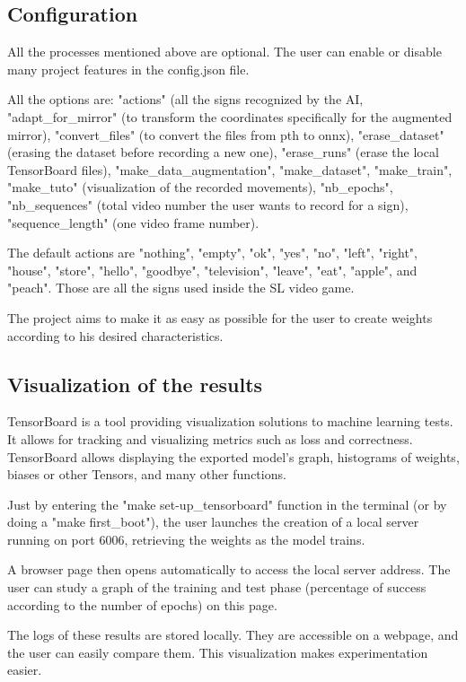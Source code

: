 \subsection{Configuration}

All the processes mentioned above are optional. The user can enable or disable many project features in the config.json file. 

All the options are: "actions" (all the signs recognized by the AI, "adapt\_for\_mirror" (to transform the coordinates specifically for the augmented mirror), "convert\_files" (to convert the files from pth to onnx), "erase\_dataset" (erasing the dataset before recording a new one), "erase\_runs" (erase the local TensorBoard files), "make\_data\_augmentation", "make\_dataset", "make\_train", "make\_tuto" (visualization of the recorded movements), "nb\_epochs", "nb\_sequences" (total video number the user wants to record for a sign), "sequence\_length" (one video frame number).

The default actions are "nothing", "empty", "ok", "yes", "no", "left", "right", "house", "store", "hello", "goodbye", "television", "leave", "eat", "apple", and "peach". Those are all the signs used inside the SL video game.

The project aims to make it as easy as possible for the user to create weights according to his desired characteristics.

\subsection{Visualization of the results}

TensorBoard is a tool providing visualization solutions to machine learning tests. It allows for tracking and visualizing metrics such as loss and correctness. TensorBoard allows displaying the exported model's graph, histograms of weights, biases or other Tensors, and many other functions.

Just by entering the "make set-up\_tensorboard" function in the terminal (or by doing a "make first\_boot"), the user launches the creation of a local server running on port 6006, retrieving the weights as the model trains. 

A browser page then opens automatically to access the local server address. The user can study a graph of the training and test phase (percentage of success according to the number of epochs) on this page. 

The logs of these results are stored locally. They are accessible on a webpage, and the user can easily compare them. This visualization makes experimentation easier.


